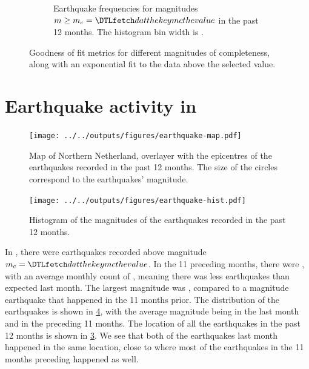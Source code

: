 \documentclass[11pt]{article}
\begin{document}
\begin{figure}[htp]
\begin{subfigure}[b]{0.49\textwidth}
    \caption{Earthquake frequencies for magnitudes $m\geq m_c=\dat{mc}$ in the past 12 months. The histogram bin width is .}
    \label{fig:hist}
\end{subfigure}
\caption{Goodness of fit metrics for different magnitudes of completeness, along with an exponential fit
to the data above the selected value.}
\label{fig:figs1}
\end{figure}

\newpage

\section*{Earthquake activity in }%

\begin{figure}[htp]
\begin{center}
    \texttt{[image: ../../outputs/figures/earthquake-map.pdf]}
\end{center}
\caption{Map of Northern Netherland, overlayer with the epicentres of the earthquakes recorded in the past 12 months.
The size of the circles correspond to the earthquakes' magnitude.}
\label{fig:map}
\end{figure}

\begin{figure}[htp]
\begin{center}
    \texttt{[image: ../../outputs/figures/earthquake-hist.pdf]}
\end{center}
\caption{Histogram of the magnitudes of the earthquakes recorded in the past 12 months.}
\label{fig:hist}
\end{figure}

In , there were  earthquakes recorded above magnitude
$m_c=\dat{mc}$. In the 11 preceding months, there were , with an average monthly
count of , meaning there was less earthquakes than expected last month.
The largest magnitude was , compared to a magnitude  earthquake that
happened in the 11 months prior. The distribution of the earthquakes is shown in \cref{fig:hist}, with the
average magnitude being  in the last month and  in the preceding 11 months.
The location of all the earthquakes in the past 12 months is shown in \cref{fig:map}.
We see that both of the earthquakes last month happened in the same location, close to where most of the earthquakes in the
11 months preceding happened as well.
\end{document}

